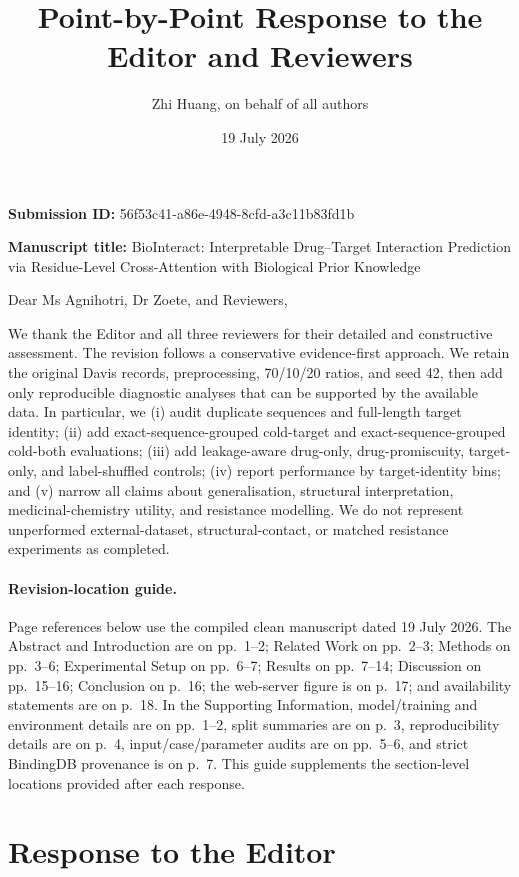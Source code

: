 \documentclass[11pt,a4paper]{article}
\title{Point-by-Point Response to the Editor and Reviewers}
\author{Zhi Huang, on behalf of all authors}
\date{19 July 2026}
\begin{document}
\maketitle

\noindent\textbf{Submission ID:} 56f53c41-a86e-4948-8cfd-a3c11b83fd1b

\noindent\textbf{Manuscript title:} BioInteract: Interpretable Drug--Target Interaction Prediction via Residue-Level Cross-Attention with Biological Prior Knowledge

\medskip
\noindent Dear Ms Agnihotri, Dr Zoete, and Reviewers,

\medskip
We thank the Editor and all three reviewers for their detailed and constructive
assessment.  The revision follows a conservative evidence-first approach.  We
retain the original Davis records, preprocessing, 70/10/20 ratios, and seed 42,
then add only reproducible diagnostic analyses that can be supported by the
available data.  In particular, we (i) audit duplicate sequences and full-length
target identity; (ii) add exact-sequence-grouped cold-target and
exact-sequence-grouped cold-both
evaluations; (iii) add leakage-aware drug-only, drug-promiscuity, target-only,
and label-shuffled controls; (iv) report performance by target-identity bins;
and (v) narrow all claims about generalisation, structural interpretation,
medicinal-chemistry utility, and resistance modelling.  We do not represent
unperformed external-dataset, structural-contact, or matched resistance
experiments as completed.

\paragraph{Revision-location guide.}
Page references below use the compiled clean manuscript dated 19 July 2026.
The Abstract and Introduction are on pp.~1--2; Related Work on pp.~2--3;
Methods on pp.~3--6; Experimental Setup on pp.~6--7; Results on pp.~7--14;
Discussion on pp.~15--16; Conclusion on p.~16; the web-server figure is on
p.~17; and availability statements are on p.~18. In the Supporting Information, model/training and environment details are
on pp.~1--2, split summaries are on p.~3, reproducibility details are on p.~4,
input/case/parameter audits are on pp.~5--6, and strict BindingDB provenance is
on p.~7. This guide supplements the section-level locations provided after each
response.

\section*{Response to the Editor}
\end{document}
